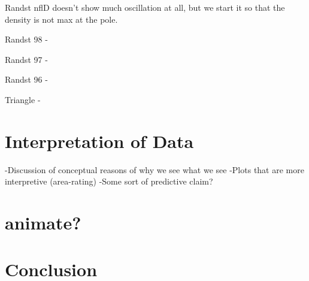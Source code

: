 \documentclass[letterpaper,twocolumn,amsmath,amssymb,pre]{revtex4-1}
\begin{document}
Randst nflD doesn't show much oscillation at all, but we start it so
that the density is not max at the pole.







Randst 98 -

Randst 97 -

Randst 96 -

Triangle -


\section{Interpretation of Data}
-Discussion of conceptual reasons of why we see what we see
-Plots that are more interpretive (area-rating)
-Some sort of predictive claim?

\section{animate?}



\section{Conclusion}
\end{document}
